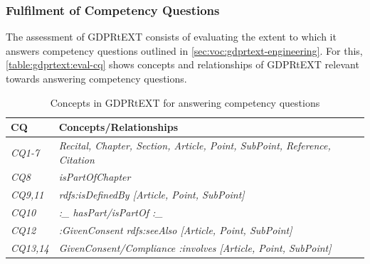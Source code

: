 \subsubsection{Fulfilment of Competency Questions}
The assessment of GDPRtEXT consists of evaluating the extent to which it answers competency questions outlined in \autoref{sec:voc:gdprtext-engineering}.
For this, \autoref{table:gdprtext:eval-cq} shows concepts and relationships of GDPRtEXT relevant towards answering competency questions.
\begin{table}[htbp]
\footnotesize
\centering
{}
\begin{tabularx}{\textwidth}{|l|X|}
\caption{Concepts in GDPRtEXT for answering competency questions} \\ \hline
\label{table:gdprtext:eval-cq}
\textbf{CQ} & \textbf{Concepts/Relationships} \\ \hline
\textit{CQ1-7} & \textit{Recital, Chapter, Section, Article, Point, SubPoint, Reference, Citation} \\ \hline
\textit{CQ8} & \textit{isPartOfChapter} \\ \hline
\textit{CQ9,11} & \textit{rdfs:isDefinedBy [Article, Point, SubPoint]} \\ \hline
\textit{CQ10} & \textit{:\_ hasPart/isPartOf :\_} \\ \hline
\textit{CQ12} & \textit{:GivenConsent rdfs:seeAlso [Article, Point, SubPoint]} \\ \hline
\textit{CQ13,14} & \textit{GivenConsent/Compliance :involves [Article, Point, SubPoint]} \\ \hline


\end{tabularx}
\end{table}
